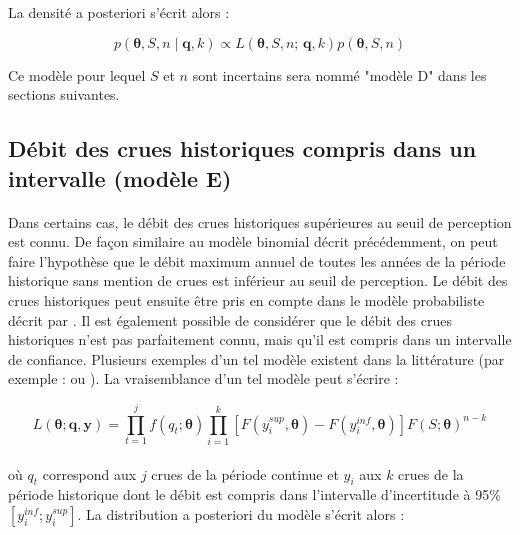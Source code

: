 		La densité a posteriori s'écrit alors :
					
			\begin{equation}
				p(\boldsymbol{\theta}, S, n \mid \boldsymbol{q},k) \propto L(\boldsymbol{\theta},S, n;\,\boldsymbol{q},k) p(\boldsymbol{\theta},S, n)
				\label{eq:Bayes_uSN}
			\end{equation}

	Ce modèle pour lequel $S$ et $n$ sont incertains sera nommé "modèle D" dans les sections suivantes. 
	
	\subsection{Débit des crues historiques compris dans un intervalle (modèle E)}
	\label{subsec:modE}	
		
	\paragraph{} Dans certains cas, le débit des crues historiques supérieures au seuil de perception est connu. De façon similaire au modèle binomial décrit précédemment, on peut faire l'hypothèse que le débit maximum annuel de toutes les années de la période historique sans mention de crues est inférieur au seuil de perception. Le débit des crues historiques peut ensuite être pris en compte dans le modèle probabiliste décrit par \citet{stedinger_flood_1986}. Il est également possible de considérer que le débit des crues historiques n'est pas parfaitement connu, mais qu'il est compris dans un intervalle de confiance. Plusieurs exemples d'un tel modèle existent dans la littérature (par exemple : \citet{payrastre_usefulness_2011} ou \citet{parkes_defining_2016}). La vraisemblance d'un tel modèle peut s'écrire : 

		\begin{equation}
					L(\boldsymbol{\theta} ; \boldsymbol{q}, \boldsymbol{y}) =\prod_{t=1}^j f\left(q_t;\boldsymbol{\theta}\right) \prod_{i=1}^k \left[F(y_{i}^{sup},\boldsymbol{\theta} ) - F(y_i^{inf},\boldsymbol{\theta})\right]  F\left(S;\boldsymbol{\theta}\right)^{n-k}
		\label{eq:Censure}
		\end{equation}
					
		\paragraph{}où $q_t$ correspond aux $j$ crues de la période continue et $y_i$ aux $k$ crues de la période historique dont le débit est compris dans l'intervalle d'incertitude à 95\% $\left[y_i^{inf} ; y_i^{sup}\right]$. La distribution a posteriori du modèle s'écrit alors : 
				
